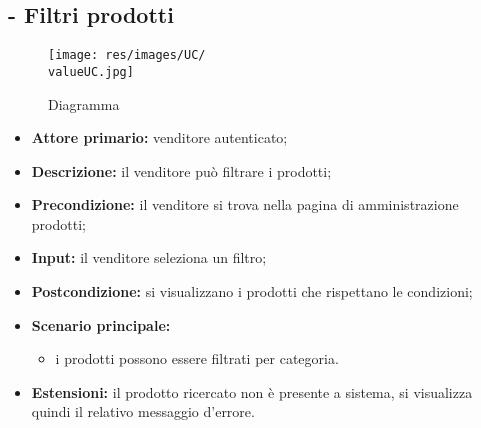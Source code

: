 \subsection{- Filtri prodotti}
\begin{figure}[H]
    \centering
    \texttt{[image: res/images/UC/\\valueUC.jpg]}
    \caption{Diagramma }
\end{figure}
\begin{itemize}
    \item \textbf{Attore primario:} venditore autenticato;
    \item \textbf{Descrizione:} il venditore può filtrare i prodotti;
    \item \textbf{Precondizione:} il venditore si trova nella pagina di amministrazione prodotti;
    \item \textbf{Input:} il venditore seleziona un filtro;
    \item \textbf{Postcondizione:} si visualizzano i prodotti che rispettano le condizioni;
    \item \textbf{Scenario principale:}
    \begin{itemize}
        \item i prodotti possono essere filtrati per categoria.
    \end{itemize}
    \item \textbf{Estensioni:} il prodotto ricercato non è presente a sistema, si visualizza quindi il relativo messaggio d'errore.
\end{itemize}


